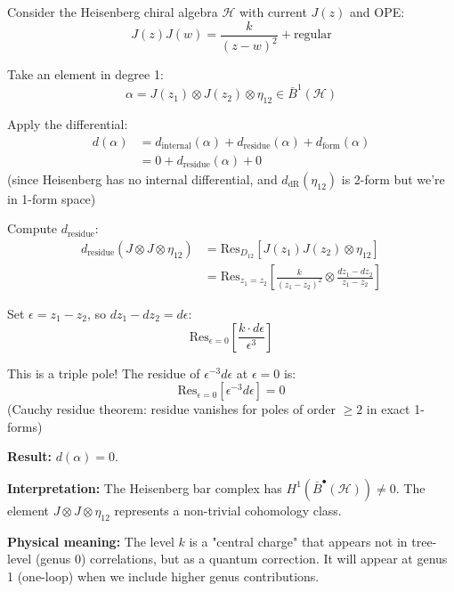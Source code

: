 \begin{example}\label{ex:heisenberg-d-deg1}
Consider the Heisenberg chiral algebra $\mathcal{H}$ with current $J(z)$ and OPE:
$$J(z)J(w) = \frac{k}{(z-w)^2} + \text{regular}$$

Take an element in degree 1:
$$\alpha = J(z_1) \otimes J(z_2) \otimes \eta_{12} \in \bar{B}^1(\mathcal{H})$$

Apply the differential:
\begin{align*}
d(\alpha) &= d_{\text{internal}}(\alpha) + d_{\text{residue}}(\alpha) + d_{\text{form}}(\alpha) \\
&= 0 + d_{\text{residue}}(\alpha) + 0
\end{align*}
(since Heisenberg has no internal differential, and $d_{\text{dR}}(\eta_{12})$ is 2-form but we're in 1-form space)

Compute $d_{\text{residue}}$:
\begin{align*}
d_{\text{residue}}(J \otimes J \otimes \eta_{12}) &= \text{Res}_{D_{12}}\left[J(z_1)J(z_2) \otimes \eta_{12}\right] \\
&= \text{Res}_{z_1 = z_2}\left[\frac{k}{(z_1-z_2)^2} \otimes \frac{dz_1 - dz_2}{z_1 - z_2}\right]
\end{align*}

Set $\epsilon = z_1 - z_2$, so $dz_1 - dz_2 = d\epsilon$:
$$\text{Res}_{\epsilon = 0}\left[\frac{k \cdot d\epsilon}{\epsilon^3}\right]$$

This is a triple pole! The residue of $\epsilon^{-3}d\epsilon$ at $\epsilon=0$ is:
$$\text{Res}_{\epsilon=0}[\epsilon^{-3}d\epsilon] = 0$$
(Cauchy residue theorem: residue vanishes for poles of order $\geq 2$ in exact 1-forms)

\textbf{Result:} $d(\alpha) = 0$.

\textbf{Interpretation:} The Heisenberg bar complex has $H^1(\bar{B}^{\bullet}(\mathcal{H})) \neq 0$. The element $J \otimes J \otimes \eta_{12}$ represents a non-trivial cohomology class.

\textbf{Physical meaning:} The level $k$ is a "central charge" that appears not in tree-level (genus 0) correlations, but as a quantum correction. It will appear at genus 1 (one-loop) when we include higher genus contributions.
\end{example}

